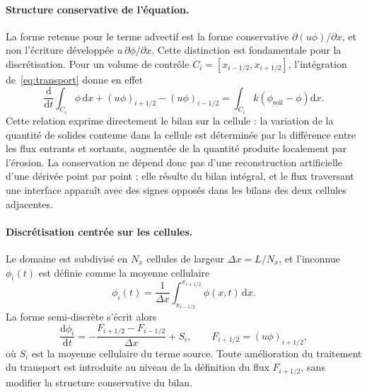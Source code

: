 \documentclass[11pt,a4paper]{report}
\newcommand{\phisol}{\phi_{\mathrm{soil}}}
\begin{document}
\paragraph{Structure conservative de l'équation.} La forme retenue pour le terme advectif est la forme
conservative \(\partial(u\phi)/\partial x\), et non l'écriture développée \(u\,\partial\phi/\partial x\).
Cette distinction est fondamentale pour la discrétisation. Pour un volume de contrôle
\(C_i = [x_{i-1/2}, x_{i+1/2}]\), l'intégration de~\eqref{eq:transport} donne en effet
\begin{equation}
\frac{\mathrm{d}}{\mathrm{d}t}\int_{C_i}\phi\,\mathrm{d}x
+ (u\phi)_{i+1/2} - (u\phi)_{i-1/2}
= \int_{C_i} k\left(\phisol-\phi\right)\mathrm{d}x .
\label{eq:bilan-integral}
\end{equation}
Cette relation exprime directement le bilan sur la cellule : la variation de la quantité de solides
contenue dans la cellule est déterminée par la différence entre les flux entrants et sortants, augmentée
de la quantité produite localement par l'érosion. La conservation ne dépend donc pas d'une reconstruction
artificielle d'une dérivée point par point ; elle résulte du bilan intégral, et le flux traversant une
interface apparaît avec des signes opposés dans les bilans des deux cellules adjacentes.

\paragraph{Discrétisation centrée sur les cellules.} Le domaine est subdivisé en \(N_x\) cellules de
largeur \(\Delta x = L/N_x\), et l'inconnue \(\phi_i(t)\) est définie comme la moyenne cellulaire
\begin{equation}
\phi_i(t) = \frac{1}{\Delta x}\int_{x_{i-1/2}}^{x_{i+1/2}}\phi(x,t)\,\mathrm{d}x .
\label{eq:moyenne-cellulaire}
\end{equation}
La forme semi-discrète s'écrit alors
\begin{equation}
\frac{\mathrm{d}\phi_i}{\mathrm{d}t}
= -\frac{F_{i+1/2} - F_{i-1/2}}{\Delta x} + S_i,
\qquad
F_{i+1/2} = (u\phi)_{i+1/2},
\label{eq:semi-discret}
\end{equation}
où \(S_i\) est la moyenne cellulaire du terme source. Toute amélioration du traitement du transport est
introduite au niveau de la définition du flux \(F_{i+1/2}\), sans modifier la structure conservative du
bilan.
\end{document}
